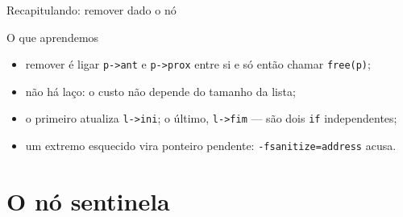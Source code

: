 \documentclass[aspectratio=169]{beamer}
\begin{document}
\begin{frame}{Recapitulando: remover dado o nó}
  \begin{block}{O que aprendemos}
    \begin{itemize}
      \item remover é ligar \texttt{p->ant} e \texttt{p->prox} entre si e só
        então chamar \texttt{free(p)};
      \item não há laço: o custo não depende do tamanho da lista;
      \item o primeiro atualiza \texttt{l->ini}; o último,
        \texttt{l->fim} --- são dois \texttt{if} independentes;
      \item um extremo esquecido vira ponteiro pendente:
        \texttt{-fsanitize=address} acusa.
    \end{itemize}
  \end{block}
\end{frame}

\section{O nó sentinela}
\end{document}
